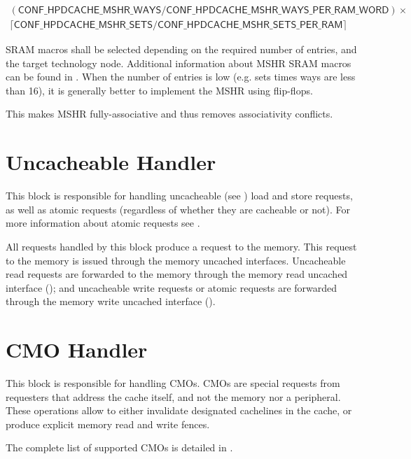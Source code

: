 \documentclass[10pt,titlepage,twoside]{book}
\begin{document}
\begin{equation*}
\begin{split}
\mathsf{(CONF\_HPDCACHE\_MSHR\_WAYS/CONF\_HPDCACHE\_MSHR\_WAYS\_PER\_RAM\_WORD)\times} \\
\mathsf{\lceil{}CONF\_HPDCACHE\_MSHR\_SETS/CONF\_HPDCACHE\_MSHR\_SETS\_PER\_RAM{}\rceil}
\end{split}
\end{equation*}

SRAM macros shall be selected depending on the required number of entries, and the target technology node. Additional information about \ac{MSHR} SRAM macros can be found in .
When the number of entries is low (e.g. sets times ways are less than 16), it is generally better to implement the \ac{MSHR} using flip-flops.

This makes \ac{MSHR} fully-associative and thus removes associativity conflicts.


\section{Uncacheable Handler}

This block is responsible for handling uncacheable (see ) load and store requests, as well as atomic requests (regardless of whether they are cacheable or not).
For more information about atomic requests see .

All requests handled by this block produce a request to the memory.
This request to the memory is issued through the memory uncached interfaces.
Uncacheable read requests are forwarded to the memory through the memory read uncached interface ();
and uncacheable write requests or atomic requests are forwarded through the memory write uncached interface ().


\section{\acf{CMO} Handler}

This block is responsible for handling \acp{CMO}.
\acp{CMO} are special requests from requesters that address the cache itself, and not the memory nor a peripheral.
These operations allow to either invalidate designated cachelines in the cache, or produce explicit memory read and write fences.

The complete list of supported \acp{CMO} is detailed in .
\end{document}
